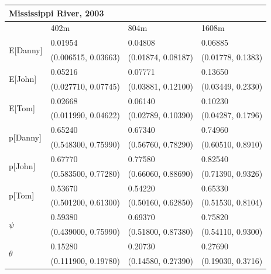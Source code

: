 \documentclass{beamer}
\begin{document}
\begin{frame}{}
	\small{
    \begin{table}
    \begin{center}
    \begin{tabular}{|l|l|l|l|}
        \hline
        \multicolumn{4}{|l|}{\textbf{Mississippi River, 2003}} \\
        \hline
            & 402m & 804m & 1608m \\
        \hline
        \multirow{2}{*}{E[Danny]}
            & 0.01954 & 0.04808 & 0.06885 \\
            & (0.006515, 0.03663) & (0.01874, 0.08187) & (0.01778, 0.1383) \\
        \hline
        \multirow{2}{*}{E[John]}
            & 0.05216 & 0.07771 & 0.13650 \\
            & (0.027710, 0.07745) & (0.03881, 0.12100) & (0.03449, 0.2330) \\
        \hline
        \multirow{2}{*}{E[Tom]}
            & 0.02668 & 0.06140 & 0.10230 \\
            & (0.011990, 0.04622) & (0.02789, 0.10390) & (0.04287, 0.1796) \\
        \hline
        \multirow{2}{*}{p[Danny]}
            & 0.65240 & 0.67340 & 0.74960 \\
            & (0.548300, 0.75990) & (0.56760, 0.78290) & (0.60510, 0.8910) \\
        \hline
        \multirow{2}{*}{p[John]}
            & 0.67770 & 0.77580 & 0.82540 \\
            & (0.583500, 0.77280) & (0.66060, 0.88690) & (0.71390, 0.9326) \\
        \hline
        \multirow{2}{*}{p[Tom]}
            & 0.53670 & 0.54220 & 0.65330 \\
            & (0.501200, 0.61300) & (0.50160, 0.62850) & (0.51530, 0.8104) \\
        \hline
        \multirow{2}{*}{\(\psi\)}
            & 0.59380 & 0.69370 & 0.75820 \\
            & (0.439000, 0.75990) & (0.51800, 0.87380) & (0.54110, 0.9300) \\
        \hline
        \multirow{2}{*}{\(\theta\)}
            & 0.15280 & 0.20730 & 0.27690 \\
            & (0.111900, 0.19780) & (0.14580, 0.27390) & (0.19030, 0.3716) \\
        \hline
    \end{tabular}
    \end{center}
	\end{table} 
	}
\end{frame}
\end{document}
